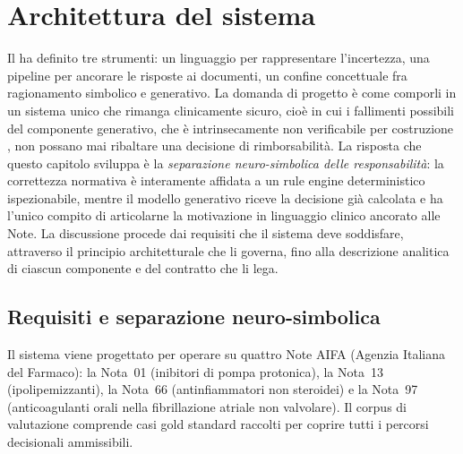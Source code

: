 \chapter{Architettura del sistema}
\label{ch:progettazione}

Il  ha definito tre strumenti: un linguaggio per
rappresentare l'incertezza, una pipeline per ancorare le risposte ai
documenti, un confine concettuale fra ragionamento simbolico e generativo.
La domanda di progetto è come comporli in un sistema unico che rimanga
clinicamente sicuro, cioè in cui i fallimenti possibili del componente
generativo, che è intrinsecamente non verificabile per costruzione
\cite{ji2023hallucination, thirunavukarasu2023llm}, non possano mai
ribaltare una decisione di rimborsabilità. La risposta che questo capitolo
sviluppa è la \emph{separazione neuro-simbolica delle responsabilità}: la
correttezza normativa è interamente affidata a un rule engine deterministico
ispezionabile, mentre il modello generativo riceve la decisione già calcolata
e ha l'unico compito di articolarne la motivazione in linguaggio clinico
ancorato alle Note. La discussione procede dai requisiti che il sistema deve
soddisfare, attraverso il principio architetturale che li governa, fino alla
descrizione analitica di ciascun componente e del contratto che li lega.

\section{Requisiti e separazione neuro-simbolica}
\label{sec:requisiti}

Il sistema viene progettato per operare su quattro Note AIFA (Agenzia Italiana del Farmaco): la Nota~01
(inibitori di pompa protonica), la Nota~13 (ipolipemizzanti), la Nota~66
(antinfiammatori non steroidei) e la Nota~97 (anticoagulanti orali nella
fibrillazione atriale non valvolare).
Il corpus di valutazione comprende \goldn{} casi gold standard raccolti
per coprire tutti i percorsi decisionali ammissibili.

